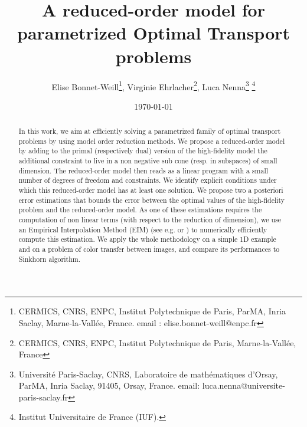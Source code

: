 \documentclass{article}
\title{A reduced-order model for parametrized Optimal Transport problems}
\author{Elise Bonnet-Weill\thanks{ CERMICS, CNRS, ENPC, Institut Polytechnique de Paris, ParMA, Inria Saclay, Marne-la-Vallée, France.
email : elise.bonnet-weill@enpc.fr},
Virginie Ehrlacher\thanks{ CERMICS, CNRS, ENPC, Institut Polytechnique de Paris, Marne-la-Vallée, France}, Luca Nenna\thanks{Universit\'e Paris-Saclay, CNRS, Laboratoire de math\'ematiques d'Orsay, ParMA, Inria Saclay, 91405, Orsay, France. 
email: luca.nenna@universite-paris-saclay.fr} \thanks{Institut Universitaire de France (IUF).}}
\date{\today}
\begin{document}
\maketitle

\begin{abstract}
    In this work, we aim at efficiently solving a parametrized family of optimal transport problems by using model order reduction methods. We propose a reduced-order model by adding to the primal (respectively dual) version of the high-fidelity model the additional constraint to live in a non negative sub cone (resp. in subspaces) of small dimension. The reduced-order model then reads as a linear program with a small number of degrees of freedom and constraints.  We identify explicit conditions under which this reduced-order model has at least one solution. We propose two a posteriori error estimations that bounds the error between the optimal values of the high-fidelity problem and the reduced-order model. As one of these estimations requires the computation of non linear terms (with respect to the reduction of dimension), we use an Empirical Interpolation Method (EIM) (see e.g. \cite{maday2007general} or \cite{barrault2004empirical}) to numerically efficiently compute  this estimation. We apply the whole methodology on a simple 1D example and on a problem of color transfer between images, and compare its performances to Sinkhorn algorithm. 
\end{abstract}




\end{document}
